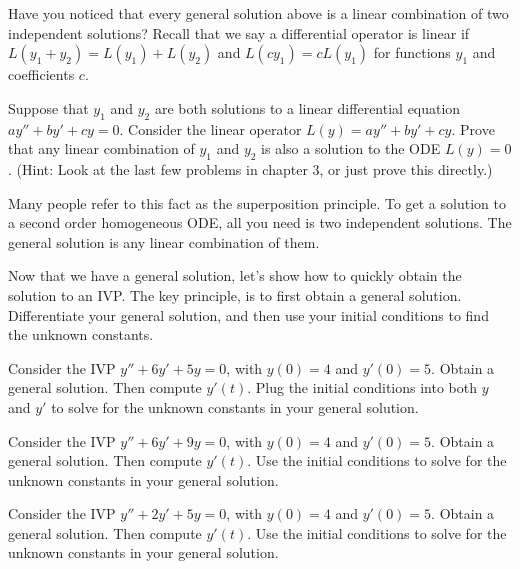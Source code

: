 Have you noticed that every general solution above is a linear combination of two independent solutions?  Recall that we say a differential operator is linear if $L(y_1+y_2) = L(y_1)+L(y_2)$ and $L(cy_1)=cL(y_1)$ for functions $y_1$ and coefficients $c$.  
\begin{problem}\label{superposition principle}
 Suppose that $y_1$ and $y_2$ are both solutions to a linear differential equation $ay''+b y'+cy=0$.  Consider the linear operator $L(y) = ay''+by'+cy$.  Prove that any linear combination of $y_1$ and $y_2$ is also a solution to the ODE $L(y)=0$. (Hint:  Look at the last few problems in chapter 3, or just prove this directly.)  

 Many people refer to this fact as the superposition principle. To get a solution to a second order homogeneous ODE, all you need is two independent solutions. The general solution is any linear combination of them.
\end{problem}

Now that we have a general solution, let's show how to quickly obtain the solution to an IVP. The key principle, is to first obtain a general solution. Differentiate your general solution, and then use your initial conditions to find the unknown constants.

\begin{problem}
 Consider the IVP $y''+6y'+5y=0$, with $y(0)=4$ and $y'(0)=5$.  Obtain a general solution. Then compute $y'(t)$. Plug the initial conditions into both $y$ and $y'$ to solve for the unknown constants in your general solution. 
\end{problem}

\begin{problem}
 Consider the IVP $y''+6y'+9y=0$, with $y(0)=4$ and $y'(0)=5$.  Obtain a general solution. Then compute $y'(t)$. Use the initial conditions to solve for the unknown constants in your general solution. 
\end{problem}

\begin{problem}
 Consider the IVP $y''+2y'+5y=0$, with $y(0)=4$ and $y'(0)=5$.  Obtain a general solution. Then compute $y'(t)$. Use the initial conditions to solve for the unknown constants in your general solution. 
\end{problem}



 









